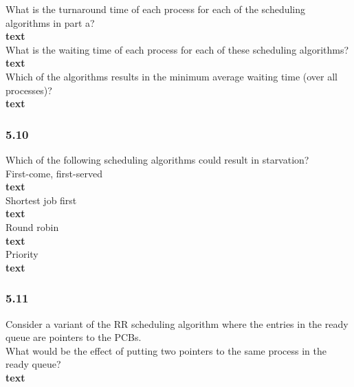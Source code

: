\documentclass[a4paper,10pt,titlepage]{report}
\begin{document}
\hspace{10mm}What is the turnaround time of each process for each of the scheduling algorithms in part a? \\
\hspace{20mm} \textbf{text} \\


\hspace{10mm}What is the waiting time of each process for each of these scheduling algorithms? \\
\hspace{20mm} \textbf{text} \\


\hspace{10mm}Which of the algorithms results in the minimum average waiting time (over all processes)? \\
\hspace{20mm} \textbf{text} \\



\subsubsection{5.10}
Which of the following scheduling algorithms could result in starvation?\\
\hspace{10mm}First-come, first-served\\
\hspace{20mm} \textbf{text} \\


\hspace{10mm}Shortest job first\\
\hspace{20mm} \textbf{text} \\


\hspace{10mm}Round robin\\
\hspace{20mm} \textbf{text} \\


\hspace{10mm}Priority\\
\hspace{20mm} \textbf{text} \\

\subsubsection{5.11}
Consider a variant of the RR scheduling algorithm where the entries in the ready queue are pointers to the PCBs. \\
\hspace{10mm}What would be the effect of putting two pointers to the same process in the ready queue?\\
\hspace{20mm} \textbf{text} \\
\end{document}
